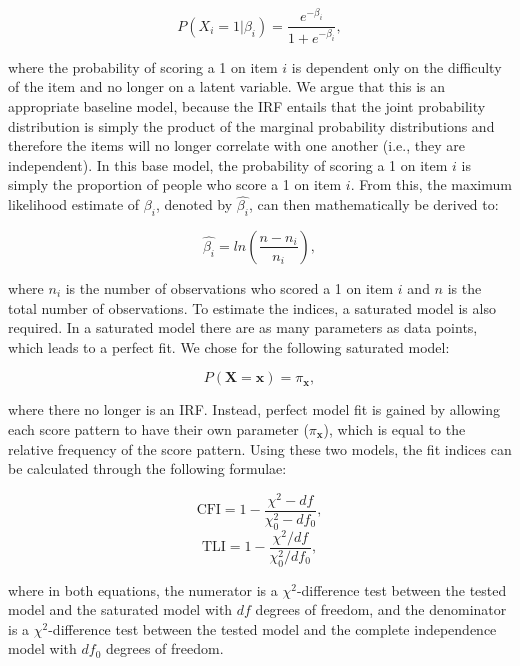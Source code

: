 \documentclass[Royal,sageapa,times,doublespace]{sagej}
\begin{document}
\begin{equation}
P(X_i = 1 | \beta_{i}) = \frac{e^{- \beta_{i}}}{1 + e^{- \beta_{i}}},
\end{equation}

where the probability of scoring a 1 on item $i$ is dependent only on the difficulty of the item and no longer on a latent variable. We argue that this is an appropriate baseline model, because the IRF entails that the joint probability distribution is simply the product of the marginal probability distributions and therefore the items will no longer correlate with one another (i.e., they are independent). In this base model, the probability of scoring a 1 on item $i$ is simply the proportion of people who score a 1 on item $i$. From this, the maximum likelihood estimate of $\beta_{i}$, denoted by $\hat{\beta_{i}}$, can then mathematically be derived to:


\begin{equation*}
\hat{\beta_{i}} = ln(\frac{n - n_i}{n_i}), 
\end{equation*}

where $n_i$ is the number of observations who scored a 1 on item $i$ and $n$ is the total number of observations. To estimate the indices, a saturated model is also required. In a saturated model there are as many parameters as data points, which leads to a perfect fit. We chose for the following saturated model:

\begin{equation}
P(\boldsymbol{X} = \boldsymbol{x}) = \pi_{\boldsymbol{x}},
\end{equation}

where there no longer is an IRF. Instead, perfect model fit is gained by allowing each score pattern to have their own parameter ($\pi_{\boldsymbol{x}}$), which is equal to the relative frequency of the score pattern. Using these two models, the fit indices can be calculated through the following formulae:

\begin{equation}
\text{CFI} = 1 - \frac{\chi^{2} - df}{\chi^{2}_{0} - df_0},
\end{equation}
\begin{equation}
\text{TLI} = 1 - \frac{\chi^{2}/df}{\chi^{2}_{0}/df_0},
\end{equation}

where in both equations, the numerator is a $\chi^2$-difference test between the tested model and the saturated model with $df$ degrees of freedom, and the denominator is a $\chi^2$-difference test between the tested model and the complete independence model with $df_0$ degrees of freedom.
\end{document}
